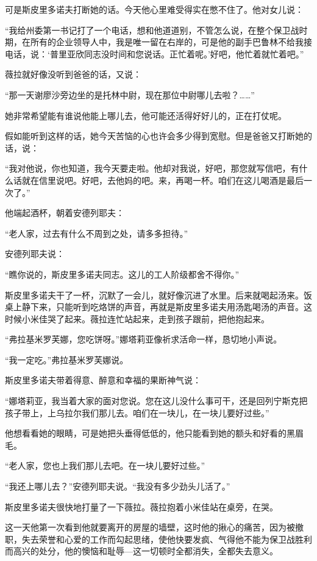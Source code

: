可是斯皮里多诺夫打断她的话。今天他心里难受得实在憋不住了。他对女儿说：

“我给州委第一书记打了一个电话，想和他道道别，不管怎么说，在整个保卫战时期，在所有的企业领导人中，我是唯一留在右岸的，可是他的副手巴鲁林不给我接电话，说：‘普里亚欣同志没时间和您说话。正忙着呢。’好吧，他忙着就忙着吧。”

薇拉就好像没听到爸爸的话，又说：

“那一天谢廖沙旁边坐的是托林中尉，现在那位中尉哪儿去啦？……”

她非常希望能有谁说他能上哪儿去，他可能还活得好好儿的，正在打仗呢。

假如能听到这样的话，她今天苦恼的心也许会多少得到宽慰。但是爸爸又打断她的话，说：

“我对他说，你也知道，我今天要走啦。他却对我说，好吧，那您就写信吧，有什么话就在信里说吧。好吧，去他妈的吧。来，再喝一杯。咱们在这儿喝酒是最后一次了。”

他端起酒杯，朝着安德列耶夫：

“老人家，过去有什么不周到之处，请多多担待。”

安德列耶夫说：

“瞧你说的，斯皮里多诺夫同志。这儿的工人阶级都舍不得你。”

斯皮里多诺夫干了一杯，沉默了一会儿，就好像沉进了水里。后来就喝起汤来。饭桌上静下来，只能听到吃烙饼的声音，再就是斯皮里多诺夫用汤匙喝汤的声音。这时候小米佳哭了起来。薇拉连忙站起来，走到孩子跟前，把他抱起来。

“弗拉基米罗芙娜，您吃饼呀。”娜塔莉亚像祈求活命一样，恳切地小声说。

“我一定吃。”弗拉基米罗芙娜说。

斯皮里多诺夫带着得意、醉意和幸福的果断神气说：

“娜塔莉亚，我当着大家的面对您说。您在这儿没什么事可干，还是回列宁斯克把孩子带上，上乌拉尔我们那儿去。咱们在一块儿，在一块儿要好过些。”

他想看看她的眼睛，可是她把头垂得低低的，他只能看到她的额头和好看的黑眉毛。

“老人家，您也上我们那儿去吧。在一块儿要好过些。”

“我还上哪儿去？”安德列耶夫说。“我没有多少劲头儿活了。”

斯皮里多诺夫很快地打量了一下薇拉。薇拉抱着小米佳站在桌旁，在哭。

这一天他第一次看到他就要离开的房屋的墙壁，这时他的揪心的痛苦，因为被撤职，失去荣誉和心爱的工作而勾起思绪，使他快要发疯、气得他不能为保卫战胜利而高兴的处分，他的懊恼和耻辱—这一切顿时全都消失，全都失去意义。

